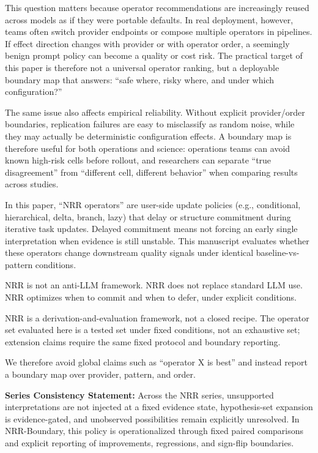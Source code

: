 \documentclass[11pt,a4paper]{article}
\begin{document}
This question matters because operator recommendations are increasingly reused across models as if they were portable defaults. In real deployment, however, teams often switch provider endpoints or compose multiple operators in pipelines. If effect direction changes with provider or with operator order, a seemingly benign prompt policy can become a quality or cost risk. The practical target of this paper is therefore not a universal operator ranking, but a deployable boundary map that answers: ``safe where, risky where, and under which configuration?''

The same issue also affects empirical reliability. Without explicit provider/order boundaries, replication failures are easy to misclassify as random noise, while they may actually be deterministic configuration effects. A boundary map is therefore useful for both operations and science: operations teams can avoid known high-risk cells before rollout, and researchers can separate ``true disagreement'' from ``different cell, different behavior'' when comparing results across studies.

In this paper, ``NRR operators'' are user-side update policies (e.g., conditional, hierarchical, delta, branch, lazy) that delay or structure commitment during iterative task updates. Delayed commitment means not forcing an early single interpretation when evidence is still unstable. This manuscript evaluates whether these operators change downstream quality signals under identical baseline-vs-pattern conditions.

NRR is not an anti-LLM framework.
NRR does not replace standard LLM use.
NRR optimizes when to commit and when to defer, under explicit conditions.

NRR is a derivation-and-evaluation framework, not a closed recipe.
The operator set evaluated here is a tested set under fixed conditions, not an exhaustive set; extension claims require the same fixed protocol and boundary reporting.

We therefore avoid global claims such as ``operator X is best'' and instead report a boundary map over provider, pattern, and order.

\textbf{Series Consistency Statement:}
Across the NRR series, unsupported interpretations are not injected at a fixed evidence state, hypothesis-set expansion is evidence-gated, and unobserved possibilities remain explicitly unresolved. In NRR-Boundary, this policy is operationalized through fixed paired comparisons and explicit reporting of improvements, regressions, and sign-flip boundaries.
\end{document}
